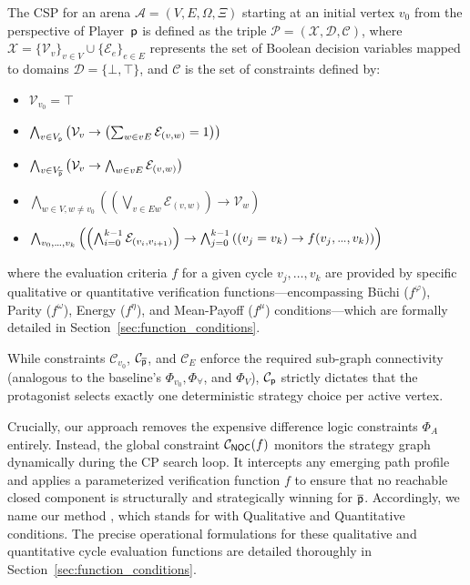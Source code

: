\documentclass[a4paper,fleqn]{cas-sc}
\begin{document}
\begin{definition}\label{def:csp}
The CSP for an arena $\mathcal{A} = (V, E, \Omega, \Xi)$ starting at an initial vertex $v_0$ from the perspective of Player~$\mathsf{p}$ is defined as the triple $\mathcal{P} = (\mathcal{X}, \mathcal{D}, \mathcal{C})$, where $\mathcal{X} = \{ \mathcal{V}_v \}_{v \in V} \cup \{ \mathcal{E}_e \}_{e \in E}$ represents the set of Boolean decision variables mapped to domains $\mathcal{D} = \{\bot, \top\}$, and $\mathcal{C}$ is the set of constraints defined by:
\begin{itemize}
    [leftmargin=2.3cm, labelwidth=2.8cm, align=right, itemsep=1.0ex, parsep=0pt]
    \item [$\mathcal{C}_{v_0}$ :] $\mathcal{V}_{v_0} = \top$
    \item [$\mathcal{C}_{\player}$ :] $\bigwedge_{v \in V_{\mathsf{p}}} \left(\mathcal{V}_v \rightarrow \left(\sum_{w \in vE} \mathcal{E}_{(v,w)}= 1\right)\right)$
    \item [$\mathcal{C}_{\opponent}$ :] $\bigwedge_{v \in V_{\overline{\mathsf{p}}}} \left(\mathcal{V}_v \rightarrow \bigwedge_{w \in vE} \mathcal{E}_{(v,w)}\right)$
    \item [$\mathcal{C}_{\!E}$ :] $\bigwedge_{w \in V, w \neq v_0} \left(\left(\bigvee_{v \in Ew} \mathcal{E}_{(v,w)}\right) \rightarrow \mathcal{V}_w\right)$
    \item [$\mathcal{C}_{\noc}(f)$ :] $\bigwedge_{v_0, .\kern-0.05em.\kern-0.05em., v_k} \left( \left(\bigwedge_{i=0}^{k-1} \mathcal{E}_{(v_i,v_{i+1})}\right) \to \bigwedge_{j=0}^{k-1} \left((v_j = v_k) \to f(v_j, .\kern-0.05em.\kern-0.05em., v_k)\right) \right)$
\end{itemize}
where the evaluation criteria $f$ for a given cycle $v_j, \dots, v_k$ are provided by specific qualitative or quantitative verification functions—encompassing Büchi ($f^\mathcal{\varphi}$), Parity ($f^\omega$), Energy ($f^\eta$), and Mean-Payoff ($f^\mu$) conditions—which are formally detailed in Section~\ref{sec:function_conditions}.

\end{definition}

While constraints $\mathcal{C}_{v_0}$, $\mathcal{C}_{\opponent}$, and $\mathcal{C}_{\!E}$ enforce the required sub-graph connectivity (analogous to the baseline's $\Phi_{v_0}, \Phi_\forall$, and $\Phi_V$), $\mathcal{C}_{\player}$ strictly dictates that the protagonist selects exactly one deterministic strategy choice per active vertex. 

Crucially, our approach removes the expensive difference logic constraints $\Phi_A$ entirely. Instead, the global constraint $\mathcal{C}_{\noc}(f)$ monitors the strategy graph dynamically during the CP search loop. It intercepts any emerging path profile and applies a parameterized verification function $f$ to ensure that no reachable closed component is structurally and strategically winning for $\overline{\mathsf{p}}$. Accordingly, we name our method \nocq, which stands for \nooppc with Qualitative and Quantitative conditions. The precise operational formulations for these qualitative and quantitative cycle evaluation functions are detailed thoroughly in Section~\ref{sec:function_conditions}.
\end{document}
